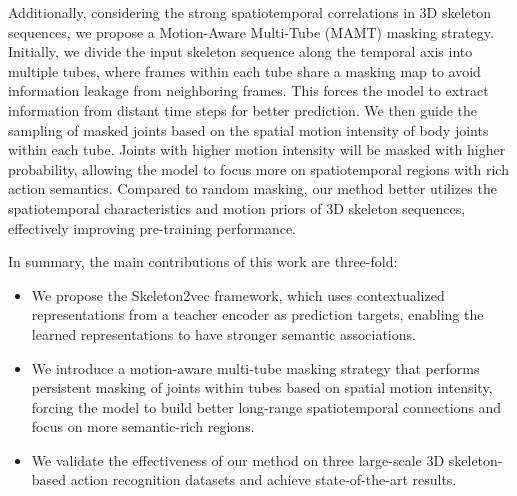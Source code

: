 Additionally, considering the strong spatiotemporal correlations in 3D skeleton sequences,
we propose a Motion-Aware Multi-Tube (MAMT) masking strategy. Initially, we divide the input skeleton
sequence along the temporal axis into multiple tubes, where frames within each tube share
a masking map to avoid information leakage from neighboring frames. This forces the model to
extract information from distant time steps for better prediction. We then guide the sampling
of masked joints based on the spatial motion intensity of body joints within each tube.
Joints with higher motion intensity will be masked with higher probability, allowing
the model to focus more on spatiotemporal regions with rich action semantics. Compared
to random masking, our method better utilizes the spatiotemporal characteristics and
motion priors of 3D skeleton sequences, effectively improving pre-training performance.

In summary, the main contributions of this work are three-fold:
\begin{itemize}
    \item{
        We propose the Skeleton2vec framework, which uses contextualized representations
        from a teacher encoder as prediction targets, enabling the learned representations
        to have stronger semantic associations.
    }
    \item{
        We introduce a motion-aware multi-tube masking strategy that performs persistent masking
        of joints within tubes based on spatial motion intensity, forcing the model to
        build better long-range spatiotemporal connections and focus on more semantic-rich regions.
    }
    \item{
        We validate the effectiveness of our method on three large-scale 3D skeleton-based
        action recognition datasets and achieve state-of-the-art results.
    }
\end{itemize}